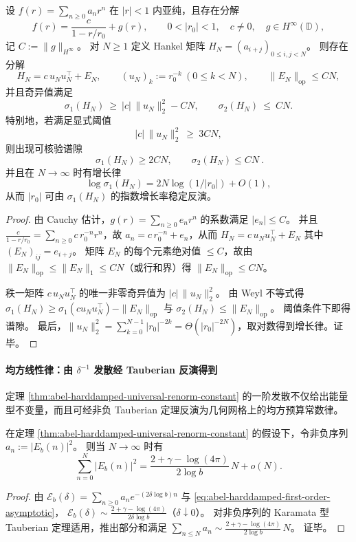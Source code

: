 \begin{theorem}\label{thm:abel-hankel-spectral-gap-single-pole}
设 \(f(r)=\sum_{n\ge 0}a_n r^n\) 在 \(|r|<1\) 内亚纯，且存在分解
\[
f(r)=\frac{c}{1-r/r_0}+g(r),
\qquad 0<|r_0|<1,\quad c\neq 0,\quad g\in H^\infty(\mathbb D),
\]
记 \(C:=\|g\|_{H^\infty}\)。
对 \(N\ge 1\) 定义 Hankel 矩阵 \(H_N=(a_{i+j})_{0\le i,j<N}\)。
则存在分解
\[
H_N=c\,u_Nu_N^{\top}+E_N,
\qquad (u_N)_k:=r_0^{-k}\ (0\le k<N),
\qquad \|E_N\|_{\mathrm{op}}\le C N,
\]
并且奇异值满足
\[
\sigma_1(H_N)\ \ge\ |c|\,\|u_N\|_2^2-CN,
\qquad
\sigma_2(H_N)\ \le\ CN.
\]
特别地，若满足显式阈值
\[
|c|\,\|u_N\|_2^2\ \ge\ 3CN,
\]
则出现可核验谱隙
\[
\boxed{\ \sigma_1(H_N)\ge 2CN,\qquad \sigma_2(H_N)\le CN\ }.
\]
并且在 \(N\to\infty\) 时有增长律
\[
\log \sigma_1(H_N)=2N\log(1/|r_0|)+O(1),
\]
从而 \(|r_0|\) 可由 \(\sigma_1(H_N)\) 的指数增长率稳定反演。
\end{theorem}
\begin{proof}
由 Cauchy 估计，\(g(r)=\sum_{n\ge 0}e_n r^n\) 的系数满足 \(|e_n|\le C\)。
并且 \(\frac{c}{1-r/r_0}=\sum_{n\ge 0}c\,r_0^{-n}r^n\)，故 \(a_n=c\,r_0^{-n}+e_n\)，从而
\(
H_N=c\,u_Nu_N^\top+E_N
\)
其中 \((E_N)_{ij}=e_{i+j}\)。
矩阵 \(E_N\) 的每个元素绝对值 \(\le C\)，故由 \(\|E_N\|_{\mathrm{op}}\le \|E_N\|_{1}\le CN\)（或行和界）得 \(\|E_N\|_{\mathrm{op}}\le CN\)。
\par
秩一矩阵 \(c\,u_Nu_N^\top\) 的唯一非零奇异值为 \(|c|\,\|u_N\|_2^2\)。
由 Weyl 不等式得
\(
\sigma_1(H_N)\ge \sigma_1(cu_Nu_N^\top)-\|E_N\|_{\mathrm{op}}
\)
与
\(
\sigma_2(H_N)\le \|E_N\|_{\mathrm{op}}
\)。
阈值条件下即得谱隙。
最后，\(\|u_N\|_2^2=\sum_{k=0}^{N-1}|r_0|^{-2k}=\Theta(|r_0|^{-2N})\)，取对数得到增长律。证毕。
\end{proof}



\paragraph{均方线性律：由 \texorpdfstring{$\delta^{-1}$}{δ^{-1}} 发散经 Tauberian 反演得到}
定理 \ref{thm:abel-harddamped-universal-renorm-constant} 的一阶发散不仅给出能量型不变量，而且可经非负 Tauberian 定理反演为几何网格上的均方预算常数律。

\begin{corollary}[几何格点上误差的均方线性律]\label{cor:abel-tauberian-mean-square-linear-law}
在定理 \ref{thm:abel-harddamped-universal-renorm-constant} 的假设下，令非负序列 \(a_n:=|E_b(n)|^2\)。
则当 \(N\to\infty\) 时有
\[
\boxed{\;
\sum_{n=0}^{N} |E_b(n)|^2
=\frac{2+\gamma-\log(4\pi)}{2\log b}\,N+o(N).\;}
\]
\end{corollary}
\begin{proof}
由 \(\mathcal E_b(\delta)=\sum_{n\ge 0}a_n e^{-(2\delta\log b)n}\) 与 \eqref{eq:abel-harddamped-first-order-asymptotic}，
\(
\mathcal E_b(\delta)\sim \frac{2+\gamma-\log(4\pi)}{2\delta\log b}
\)（\(\delta\downarrow 0\)）。
对非负序列的 Karamata 型 Tauberian 定理适用，推出部分和满足
\(
\sum_{n\le N}a_n\sim \frac{2+\gamma-\log(4\pi)}{2\log b}\,N
\)。
证毕。
\end{proof}
